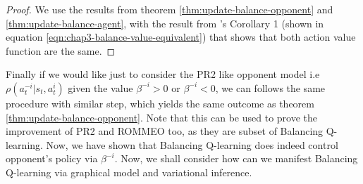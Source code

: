 \begin{proof}
We use the results from theorem \ref{thm:update-balance-opponent} and \ref{thm:update-balance-agent}, with the result from \cite{grau2018balancing}'s Corollary 1 (shown in equation \ref{eqn:chap3-balance-value-equivalent}) that shows that both action value function are the same.
\end{proof}
Finally if we would like just to consider the PR2 like opponent model i.e $\rho(a^{-i}_t | s_t, a^i_t)$ given the value $\beta^{-i} > 0$ or $\beta^{-i} < 0$, we can follows the same procedure with similar step, which yields the same outcome as theorem \ref{thm:update-balance-opponent}. Note that this can be used to prove the improvement of PR2 and ROMMEO too, as they are subset of Balancing Q-learning. Now, we have shown that Balancing Q-learning does indeed control opponent's policy via $\beta^{-i}$. Now, we shall consider how can we manifest Balancing Q-learning via graphical model and variational inference.